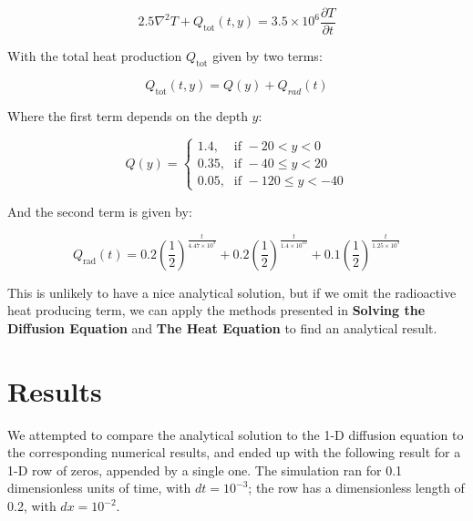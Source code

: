 \documentclass[a4paper,10pt,english]{article}
\newenvironment{boxquote}{
\begin{tcolorbox}[enhanced, colback=black!50!green!10!white, colframe=black, fuzzy shadow={0mm}{-4pt}{-0.5pt}{0.4mm}{black!60!white}]
\begin{center}}
{\end{center}\end{tcolorbox}}
\begin{document}
\begin{boxquote}
\begin{equation}
\label{eq_lithosphere}
2.5 \nabla^2 T + Q_\text{tot}(t,y) =  3.5 \times 10^6 \frac{\partial T}{\partial t}
\end{equation}

With the total heat production $Q_\text{tot}$ given by two terms:

\begin{equation}
Q_\text{tot}(t,y) = Q(y) + Q_{rad}(t)
\end{equation}

Where the first term depends on the depth $y$:

\begin{equation}
Q(y) = \begin{cases} \mbox{1.4,} & \mbox{if } -20 < y < 0 \\ \mbox{0.35,} & \mbox{if } -40 \leq y < 20 \\ \mbox{0.05,} & \mbox{if } -120 \leq y < -40 \end{cases}
\end{equation}

And the second term is given by:

\begin{equation}
Q_\text{rad}(t) = 0.2 \left( \frac{1}{2} \right)^{\tfrac{t}{4.47 \times 10^9}} + 0.2 \left( \frac{1}{2} \right)^{\tfrac{t}{1.4 \times 10^{10}}} + 0.1 \left( \frac{1}{2} \right)^{\tfrac{t}{1.25 \times 10^9}}
\end{equation}
\end{boxquote}

This is unlikely to have a nice analytical solution, but if we omit the radioactive heat producing term, we can apply the methods presented in \textbf{Solving the Diffusion Equation} and \textbf{The Heat Equation} to find an analytical result.

\section*{Results}

We attempted to compare the analytical solution to the 1-D diffusion equation to the corresponding numerical results, and ended up with the following result for a 1-D row of zeros, appended by a single one.  The simulation ran for 0.1 dimensionless units of time, with $dt = 10^{-3}$; the row has a dimensionless length of 0.2, with $dx = 10^{-2}$.
\end{document}
